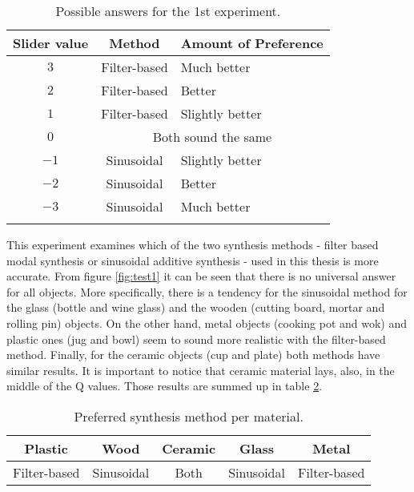 \begin{table}[H]
	\centering
    \begin{tabular}{ c  c  l  }
    \toprule
    \textbf{Slider value} & \textbf{Method} & \textbf{Amount of Preference} \\ \toprule
    \addlinespace
    $3$ & Filter-based & Much better  \\
    $2$ & Filter-based & Better \\
    $1$ & Filter-based & Slightly better \\ 
    \addlinespace
    $0$ & \multicolumn{2}{c}{Both sound the same} \\
    \addlinespace
    $-1$ & Sinusoidal & Slightly better \\ 
    $-2$ & Sinusoidal & Better \\ 
    $-3$ & Sinusoidal & Much better \\
    \addlinespace
    \bottomrule
    \end{tabular}
    \caption{Possible answers for the 1st experiment.}
    \label{tab:test1_ans}
\end{table}  

This experiment examines which of the two synthesis methods - filter based modal synthesis or sinusoidal additive synthesis - used in this thesis is more accurate. From figure \ref{fig:test1} it can be seen that there is no universal answer for all objects. More specifically, there is a tendency for the sinusoidal method for the glass (bottle and wine glass) and the wooden (cutting board, mortar and rolling pin) objects. On the other hand, metal objects (cooking pot and wok) and plastic ones (jug and bowl) seem to sound more realistic with the filter-based method. Finally, for the ceramic objects (cup and plate) both methods have similar results. It is important to notice that ceramic material lays, also, in the middle of the \gls{Q} values. Those results are summed up in table \ref{tab:method_mat}.

\begin{table}[H]
	\centering
    \begin{tabular}{ c  c  c c c }
    \toprule
    \textbf{Plastic} & \textbf{Wood} & \textbf{Ceramic} & \textbf{Glass} & \textbf{Metal} \\ \toprule
    Filter-based & Sinusoidal & Both & Sinusoidal & Filter-based  \\
    \bottomrule
    \end{tabular}
    \caption{Preferred synthesis method per material.}
    \label{tab:method_mat}
\end{table} 

